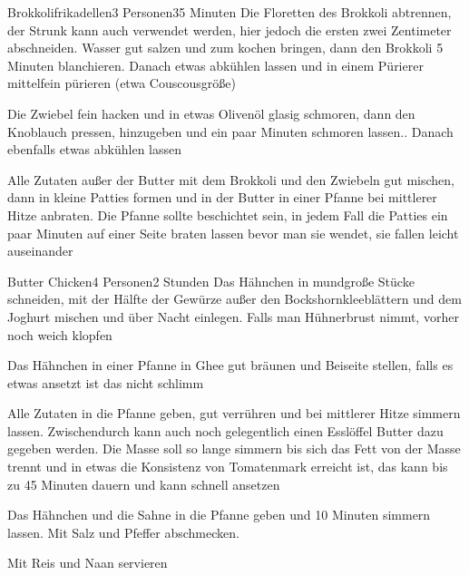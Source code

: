 \begin{recipe}{Brokkolifrikadellen}{3 Personen}{35 Minuten}
Die Floretten des Brokkoli abtrennen, der Strunk kann auch verwendet werden, hier jedoch die ersten zwei Zentimeter abschneiden. Wasser gut salzen und zum kochen bringen, dann den Brokkoli 5 Minuten blanchieren. Danach etwas abkühlen lassen und in einem Pürierer mittelfein pürieren (etwa Couscousgröße)

Die Zwiebel fein hacken und in etwas Olivenöl glasig schmoren, dann den Knoblauch pressen, hinzugeben und ein paar Minuten schmoren lassen.. Danach ebenfalls etwas abkühlen lassen

Alle Zutaten außer der Butter mit dem Brokkoli und den Zwiebeln gut mischen, dann in kleine Patties formen und in der Butter in einer Pfanne bei mittlerer Hitze anbraten. Die Pfanne sollte beschichtet sein, in jedem Fall die Patties ein paar Minuten auf einer Seite braten lassen bevor man sie wendet, sie fallen leicht auseinander
\end{recipe}


\begin{recipe}{Butter Chicken}{4 Personen}{2 Stunden}
Das Hähnchen in mundgroße Stücke schneiden, mit der Hälfte der Gewürze außer den Bockshornkleeblättern und dem Joghurt mischen und über Nacht einlegen. Falls man Hühnerbrust nimmt, vorher noch weich klopfen

Das Hähnchen in einer Pfanne in Ghee gut bräunen und Beiseite stellen, falls es etwas ansetzt ist das nicht schlimm

Alle Zutaten in die Pfanne geben, gut verrühren und bei mittlerer Hitze simmern lassen.  Zwischendurch kann auch noch gelegentlich einen Esslöffel Butter dazu gegeben werden. Die Masse soll so lange simmern bis sich das Fett von der Masse trennt und in etwas die Konsistenz von Tomatenmark erreicht ist, das kann bis zu 45 Minuten dauern und kann schnell ansetzen


Das Hähnchen und die Sahne in die Pfanne geben und 10 Minuten simmern lassen. Mit Salz und Pfeffer abschmecken.

Mit Reis und Naan servieren
\end{recipe}

